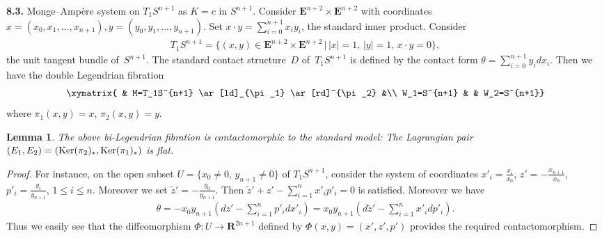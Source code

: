 \documentclass[pdftex]{sigma}
\newtheorem{Lem}[Th]{Lemma}
{ \theoremstyle{definition}
\newtheorem{Def}[Th]{Definition}
\newtheorem{Rem}[Th]{Remark}
\newtheorem{Ex}[Th]{Example}}
\begin{document}
{\bf 8.3.}
Monge--Amp{\`e}re system on $T_1S^{n+1}$
as $K=c$ in $S^{n+1}$.
Consider
${\mathbf{E}}^{n+2}\times {\mathbf{E}}^{n+2}$ with
coordinates
$x = (x_0, x_1, \dots, x_{n+1}), y = (y_0, y_1, \dots, y_{n+1})$.
Set $x\cdot y = \sum_{i=0}^{n+1}x_iy_i$,
the standard inner product.
Consider
\begin{gather*}
T_1S^{n+1} = \big\{ (x, y) \in  {\mathbf{E}}^{n+2}\times {\mathbf{E}}^{n+2}
\,|\,
\vert x \vert = 1,\, \vert y\vert = 1, \, x\cdot y = 0 \big\},
\end{gather*}
the unit tangent bundle of~$S^{n+1}$.
The standard contact structure~$D$ of~$T_1S^{n+1}$
is def\/ined by the contact form
$\theta = \sum\limits_{i=0}^{n+1} y_idx_i$.
Then we have the double Legendrian f\/ibration
\begin{gather*}
\xymatrix{
& M=T_1S^{n+1} \ar[ld]_{\pi_1} \ar[rd]^{\pi_2}  &\\
W_1=S^{n+1} &  & W_2=S^{n+1}}
\end{gather*}
where
$\pi_1(x, y) = x$, $\pi_2(x, y) = y$.

\begin{Lem}
\label{sphere-M-A}
The above bi-Legendrian fibration is contactomorphic to the standard model:
The Lagrangian pair $(E_1, E_2) = ({\rm Ker}(\pi_2)_*, {\rm Ker}(\pi_1)_*)$
is flat.
\end{Lem}

\begin{proof}
For instance, on the open subset $U = \{ x_0 \not= 0, \,y_{n+1} \not= 0\}$
of $T_1S^{n+1}$, consider the system of coordinates
$x'_i = \frac{x_i}{x_0}$, $z' = - \frac{x_{n+1}}{x_0}$, $ p'_i =
\frac{y_i}{y_{n+1}}$,
$1 \leq i \leq n$. Moreover we set $\tilde{z}' = - \frac{y_0}{y_{n+1}}$.
Then $\tilde{z}' + z' - \sum\limits_{i=1}^n x'_ip'_i = 0$ is satisf\/ied.
Moreover we have
\begin{gather*}
\theta = - x_0y_{n+1}\left(dz' - \sum_{i=1}^n p'_idx'_i\right)
= x_0y_{n+1}\left(d\tilde{z}' - \sum_{i=1}^n x'_i dp'_i\right).
\end{gather*}
Thus we easily see that the
dif\/feomorphism $\Phi \colon  U \to {\mathbf{R}}^{2n+1}$ def\/ined by $\Phi(x, y)
= (x', z', p')$ provides the required contactomorphism.
\end{proof}
\end{document}
